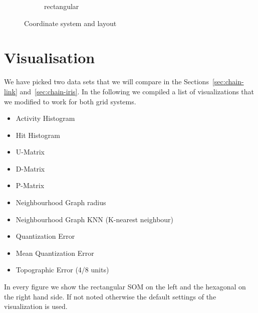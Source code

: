 \documentclass{acm_proc_article-sp}
\begin{document}
\begin{figure}
\begin{subfigure}{1\linewidth}
    \caption{rectangular}
    \label{fig:hci-coord-rect}
    \end{subfigure}
    \caption{Coordinate system and layout}
    \label{fig:coord}
\end{figure}

\section{Visualisation}

We have picked two data sets that we will compare in the Sections~\ref{sec:chain-link} and~\ref{sec:chain-iris}. In the following we compiled a list of visualizations that we modified to work for both grid systems.

\begin{itemize}
	\item Activity Histogram
	\item Hit Histogram
	\item U-Matrix
	\item D-Matrix
	\item P-Matrix
	\item Neighbourhood Graph radius
	\item Neighbourhood Graph KNN (K-nearest neighbour)

	\item Quantization Error
	\item Mean Quantization Error
	\item Topographic Error (4/8 units)
\end{itemize}

In every figure we show the rectangular SOM on the left and the hexagonal on the right hand side.
If not noted otherwise the default settings of the visualization is used.

\newcommand{\cmprecthex}[5]
{
	\begin{figure}
		\begin{subfigure}{0.49\linewidth}
			\texttt{[image: img/\#1-\#2]}
			\caption{#5}
			\label{fig:#1-#2-rect}
		\end{subfigure}
		\begin{subfigure}{0.49\linewidth}
			\texttt{[image: img/\#1-\#2-hex]}
			\caption{#4}
			\label{fig:#1-#2-hex}
		\end{subfigure}
		\caption{#3}
		\label{fig:#1-#2}
	\end{figure}
}
\end{document}
